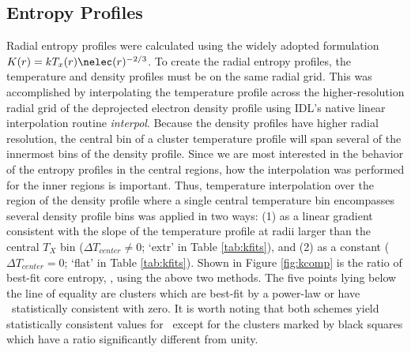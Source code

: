 \subsection{Entropy Profiles}
\label{sec:entsuppkpr}

Radial entropy profiles were calculated using the widely adopted
formulation $K(r) = kT_x(r)\nelec(r)^{-2/3}$. To create the radial
entropy profiles, the temperature and density profiles must be on the
same radial grid. This was accomplished by interpolating the
temperature profile across the higher-resolution radial grid of the
deprojected electron density profile using IDL's native linear
interpolation routine {\it{interpol}}. Because the density profiles
have higher radial resolution, the central bin of a cluster
temperature profile will span several of the innermost bins of the
density profile. Since we are most interested in the behavior of the
entropy profiles in the central regions, how the interpolation was
performed for the inner regions is important. Thus, temperature
interpolation over the region of the density profile where a single
central temperature bin encompasses several density profile bins was
applied in two ways: (1) as a linear gradient consistent with the
slope of the temperature profile at radii larger than the central
$T_X$ bin ($\Delta T_{center} \ne 0$; `extr' in Table
\ref{tab:kfits}), and (2) as a constant ($\Delta T_{center}=0$; `flat'
in Table \ref{tab:kfits}). Shown in Figure \ref{fig:kcomp} is the
ratio of best-fit core entropy, \kna, using the above two methods. The
five points lying below the line of equality are clusters which are
best-fit by a power-law or have \kna\ statistically consistent with
zero. It is worth noting that both schemes yield statistically
consistent values for \kna\ except for the clusters marked by black
squares which have a ratio significantly different from unity.

